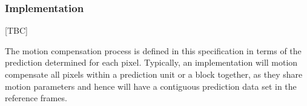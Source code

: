 \begin{informative*}
\subsubsection{Implementation}
\label{mcimplementation}
[TBC]

The motion compensation process is defined in this specification in
terms of the prediction determined for each pixel. Typically, an
implementation will motion compensate all pixels within a prediction
unit or a block together, as they share motion parameters and hence will
have a contiguous prediction data set in the reference frames.
%

%
%
%
%
%
%
%
%
%
%
%
%
%

\end{informative*}
